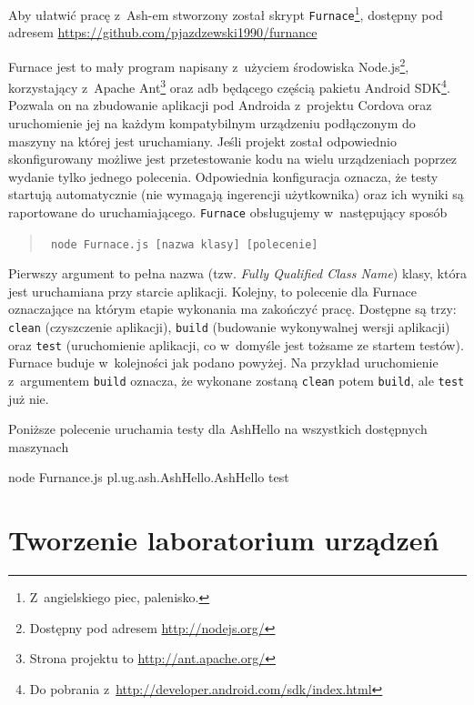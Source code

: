 \documentclass{xmgr}
\begin{document}
Aby ułatwić pracę z~Ash-em stworzony został skrypt \texttt{Furnace}\footnote{Z~angielskiego piec, palenisko.}, dostępny pod adresem \url{https://github.com/pjazdzewski1990/furnance}

Furnace jest to mały program napisany z~użyciem środowiska Node.js\footnote{Dostępny pod adresem \url{http://nodejs.org/} }, korzystający z~Apache Ant\footnote{Strona projektu to  \url{http://ant.apache.org/} } oraz adb będącego częścią pakietu Android SDK\footnote{Do pobrania z~\url{http://developer.android.com/sdk/index.html} }. Pozwala on na zbudowanie aplikacji pod Androida z~projektu Cordova oraz uruchomienie jej na każdym kompatybilnym urządzeniu podłączonym do maszyny na której jest uruchamiany. Jeśli projekt został odpowiednio skonfigurowany możliwe jest przetestowanie kodu na wielu urządzeniach poprzez wydanie tylko jednego polecenia. Odpowiednia konfiguracja oznacza, że testy startują automatycznie (nie wymagają ingerencji użytkownika) oraz ich wyniki są raportowane do uruchamiającego. \texttt{Furnace} obsługujemy w~następujący sposób

\begin{quote}
	\texttt{ node Furnace.js [nazwa klasy] [polecenie] }
\end{quote}

Pierwszy argument to pełna nazwa (tzw. \textit{Fully Qualified Class Name}) klasy, która jest uruchamiana przy starcie aplikacji.  Kolejny, to polecenie dla Furnace oznaczające na którym etapie wykonania ma zakończyć pracę. Dostępne są trzy: \texttt{clean} (czyszczenie aplikacji), \texttt{build} (budowanie wykonywalnej wersji aplikacji) oraz \texttt{test} (uruchomienie aplikacji, co w~domyśle jest tożsame ze startem testów). Furnace buduje w~kolejności jak podano powyżej. Na przykład uruchomienie z~argumentem \texttt{build} oznacza, że wykonane zostaną \texttt{clean} potem \texttt{build}, ale \texttt{test} już nie.

Poniższe polecenie uruchamia testy dla AshHello na wszystkich dostępnych maszynach 

\begin{javascriptcode}
	node Furnance.js pl.ug.ash.AshHello.AshHello test
\end{javascriptcode}

\section{Tworzenie laboratorium urządzeń}
\end{document}
